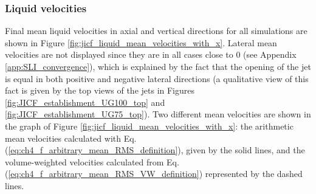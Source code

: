 \clearpage

%
%
%
%	
%	
%

\subsubsection*{Liquid velocities}

Final mean liquid velocities in axial and vertical directions for all simulations are shown in Figure \ref{fig:jicf_liquid_mean_velocities_with_x}. Lateral mean velocities are not displayed since they are in all cases close to 0 (see Appendix \ref{app:SLI_convergence}), which is explained by the fact that the opening of the jet is equal in both positive and negative lateral directions (a qualitative view of this fact is given by the top views of the jets in Figures \ref{fig:JICF_establishment_UG100_top} and \ref{fig:JICF_establishment_UG75_top}). Two different mean velocities are shown in the graph of Figure \ref{fig:jicf_liquid_mean_velocities_with_x}: the arithmetic mean velocities calculated with Eq. (\ref{eq:ch4_f_arbitrary_mean_RMS_definition}), given by the solid lines, and the volume-weighted velocities calculated from Eq. (\ref{eq:ch4_f_arbitrary_mean_RMS_VW_definition}) represented by the dashed lines.

